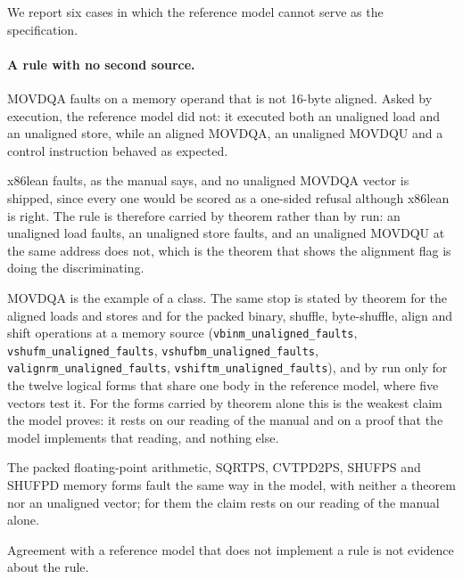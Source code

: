 \documentclass[runningheads]{llncs}
\newcommand{\src}[1]{}  %
\newcommand{\lean}[1]{\texttt{#1}}
\begin{document}
We report six cases in which the reference model cannot serve as the specification.

\paragraph{A rule with no second source.}
MOVDQA faults on a memory operand that is not 16-byte aligned. Asked by execution, the reference model
did not: it executed both an unaligned load and an unaligned store, while an aligned MOVDQA, an
unaligned MOVDQU and a control instruction behaved as expected.
\src{docs/DECISIONS.md D91 1, at a reference-model revision the record does not name (scripts/oracle\_revision.txt: earlier records
do not record their tree); D250}
x86lean faults, as the manual says, and no unaligned MOVDQA vector is shipped, since every one would be
scored as a one-sided refusal although x86lean is right. The rule is therefore carried by theorem
rather than by run: an unaligned load faults, an unaligned store faults, and an unaligned MOVDQU at the
same address does not, which is the theorem that shows the alignment flag is doing the discriminating.
\src{docs/DECISIONS.md D91 2; X86/Theorems.lean vload\_unaligned\_faults, vstore\_unaligned\_faults,
vload\_unaligned\_movdqu\_runs}
MOVDQA is the example of a class. The same stop is stated by theorem for the aligned loads and stores and
for the packed binary, shuffle, byte-shuffle, align and shift operations at a memory source
(\lean{vbinm\_\allowbreak unaligned\_\allowbreak faults}, \lean{vshufm\_\allowbreak unaligned\_\allowbreak faults},
\lean{vshufbm\_\allowbreak unaligned\_\allowbreak faults}, \lean{valignrm\_\allowbreak unaligned\_\allowbreak faults},
\lean{vshiftm\_\allowbreak unaligned\_\allowbreak faults}), and by run only for the twelve
logical forms that share one body in the reference model, where five vectors test it. For the forms carried by theorem alone this is the weakest claim the model proves: it rests on our reading of the manual and on a
proof that the model implements that reading, and nothing else.
\src{docs/DECISIONS.md D157 4 (``The run-backed set is twelve of twenty-eight kinds now''), superseding D113's three of nineteen;
X86/Theorems.lean vbinm\_unaligned\_faults docstring; Tests/Vectors.lean pand, por, pxor, pandn and andnps \_m\_unal; x86isa
machine/instructions/logical.lisp x86-andp?/andnp?/orp?/xorp?/pand/pandn/por/pxor-Op/En-RM at acl2 c8897a34, whose 16-byte check fp/arithmetic.lisp,
fp/convert.lisp and fp/logical.lisp also carry, for forms that ship no unaligned vector; D250}
The packed floating-point arithmetic, SQRTPS, CVTPD2PS, SHUFPS and SHUFPD memory forms fault the same way in
the model, with neither a theorem nor an unaligned vector; for them the claim rests on our reading of the
manual alone.
\src{X86/Semantics.lean, the aligned16 checks in the .vparithm, .vsqrtpsm, .vcvtpd2psm and .vshufpm cases; none of the four
is named in X86/Theorems.lean, and the only unaligned vectors are the five \_m\_unal rows}
Agreement with a reference model that does not implement a rule is not evidence about the rule.
\end{document}
